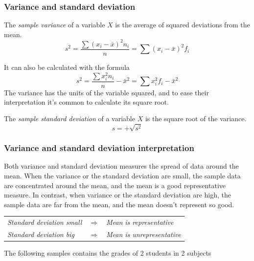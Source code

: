 \begin{frame}
\frametitle{Variance and standard deviation}
\begin{definition}
The \emph{sample variance} of a variable $X$ is the average of squared deviations from the mean. 
\[
s^2 = \frac{\sum (x_i-\bar x)^2n_i}{n} = \sum (x_i-\bar x)^2f_i
\]
\end{definition}
It can also be calculated with the formula
\[
s^2 = \frac{\sum x_i^2n_i}{n} -\bar x^2= \sum x_i^2f_i-\bar x^2
\]
The variance has the units of the variable squared, and to ease their interpretation it's common to calculate its square
root.

\begin{definition}
The \emph{sample standard deviation} of a variable $X$ is the square root of the variance.
\[
s = +\sqrt{s^2}
\]
\end{definition}
\end{frame}


\begin{frame}
\frametitle{Variance and standard deviation interpretation}
Both variance and standard deviation measures the spread of data around the mean. 
When the variance or the standard deviation are small, the sample data are concentrated around the mean, and the mean is
a good representative measure. 
In contrast, when variance or the standard deviation are high, the sample data are far from the mean, and the mean
doesn't represent so good. 
\begin{center}
\begin{tabular}{lcl}
\emph{Standard deviation small} & $\Rightarrow$ & \emph{Mean is representative}\\
\emph{Standard deviation big} & $\Rightarrow$ & \emph{Mean is unrepresentative}\\
\end{tabular}
\end{center}

 The following samples contains the grades of 2 students in 2 subjects 
\begin{center}
\scalebox{1}{}

\end{center}
\end{frame}


